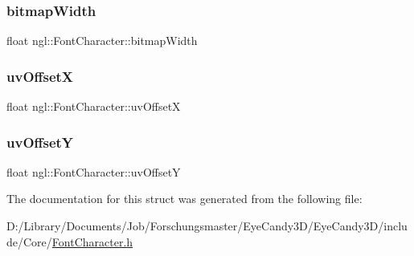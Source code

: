 \subsubsection{\texorpdfstring{bitmap\+Width}{bitmapWidth}}
{\footnotesize\ttfamily float ngl\+::\+Font\+Character\+::bitmap\+Width}

\mbox{\label{structngl_1_1_font_character_ab75d139694d86cdd6607ae43c042ea08}} 
\subsubsection{\texorpdfstring{uv\+OffsetX}{uvOffsetX}}
{\footnotesize\ttfamily float ngl\+::\+Font\+Character\+::uv\+OffsetX}

\mbox{\label{structngl_1_1_font_character_a4dd5ecb725772a4f44fd31bc11cfe954}} 
\subsubsection{\texorpdfstring{uv\+OffsetY}{uvOffsetY}}
{\footnotesize\ttfamily float ngl\+::\+Font\+Character\+::uv\+OffsetY}



The documentation for this struct was generated from the following file\+:\begin{DoxyCompactItemize}
\item 
D\+:/\+Library/\+Documents/\+Job/\+Forschungsmaster/\+Eye\+Candy3\+D/\+Eye\+Candy3\+D/include/\+Core/\mbox{\hyperlink{_font_character_8h}{Font\+Character.\+h}}\end{DoxyCompactItemize}
